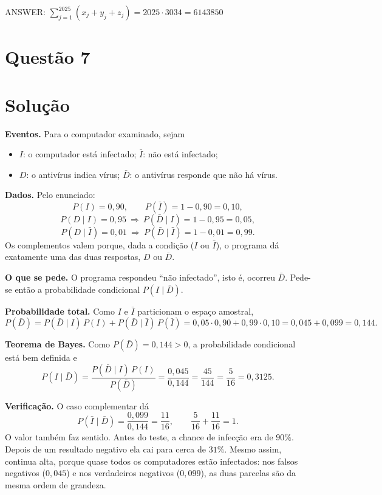 \documentclass{article}%
\begin{document}
ANSWER: $\displaystyle\sum_{j=1}^{2025}(x_j+y_j+z_j)=2025\cdot 3034=6143850$%
\newpage%
\section*{Questão 7}

\section*{Solução}

\textbf{Eventos.} Para o computador examinado, sejam
\begin{itemize}
\item $I$: o computador está infectado; $\bar I$: não está infectado;
\item $D$: o antivírus indica vírus; $\bar D$: o antivírus responde que não há vírus.
\end{itemize}

\textbf{Dados.} Pelo enunciado:
\[
P(I)=0{,}90,\qquad P(\bar I)=1-0{,}90=0{,}10,
\]
\[
P(D\mid I)=0{,}95\ \Rightarrow\ P(\bar D\mid I)=1-0{,}95=0{,}05,
\]
\[
P(D\mid \bar I)=0{,}01\ \Rightarrow\ P(\bar D\mid \bar I)=1-0{,}01=0{,}99 .
\]
Os complementos valem porque, dada a condição ($I$ ou $\bar I$), o programa dá exatamente uma das duas respostas, $D$ ou $\bar D$.

\textbf{O que se pede.} O programa respondeu ``não infectado'', isto é, ocorreu $\bar D$. Pede-se então a probabilidade condicional $P(I\mid \bar D)$.

\textbf{Probabilidade total.} Como $I$ e $\bar I$ particionam o espaço amostral,
\[
P(\bar D)=P(\bar D\mid I)\,P(I)+P(\bar D\mid \bar I)\,P(\bar I)
=0{,}05\cdot 0{,}90+0{,}99\cdot 0{,}10
=0{,}045+0{,}099=0{,}144 .
\]

\textbf{Teorema de Bayes.} Como $P(\bar D)=0{,}144>0$, a probabilidade condicional está bem definida e
\[
P(I\mid \bar D)=\frac{P(\bar D\mid I)\,P(I)}{P(\bar D)}
=\frac{0{,}045}{0{,}144}
=\frac{45}{144}
=\frac{5}{16}
=0{,}3125 .
\]

\textbf{Verificação.} O caso complementar dá
\[
P(\bar I\mid \bar D)=\frac{0{,}099}{0{,}144}=\frac{11}{16},
\qquad \frac{5}{16}+\frac{11}{16}=1 .
\]
O valor também faz sentido. Antes do teste, a chance de infecção era de $90\%$. Depois de um resultado negativo ela cai para cerca de $31\%$. Mesmo assim, continua alta, porque quase todos os computadores estão infectados: nos falsos negativos ($0{,}045$) e nos verdadeiros negativos ($0{,}099$), as duas parcelas são da mesma ordem de grandeza.
\end{document}
